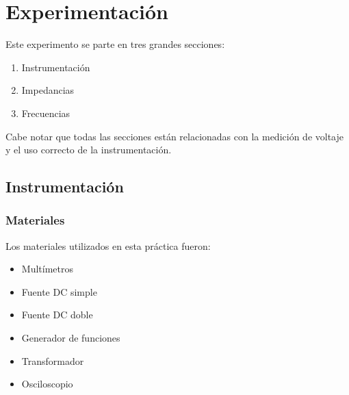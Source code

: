\documentclass{article}
\begin{document}
\section{Experimentaci\'on}
Este experimento se parte en tres grandes secciones:
\begin{enumerate}
\item Instrumentaci\'on
\item Impedancias
\item Frecuencias
\end{enumerate}
Cabe notar que todas las secciones est\'an relacionadas con la medici\'on de voltaje y el uso correcto de la instrumentaci\'on.

\subsection{Instrumentaci\'on}
\subsubsection{Materiales}
Los materiales utilizados en esta pr\'actica fueron:
\begin{itemize}
\item Mult\'imetros
\item Fuente DC simple
\item Fuente DC doble
\item Generador de funciones
\item Transformador
\item Osciloscopio
\end{itemize}
\end{document}
